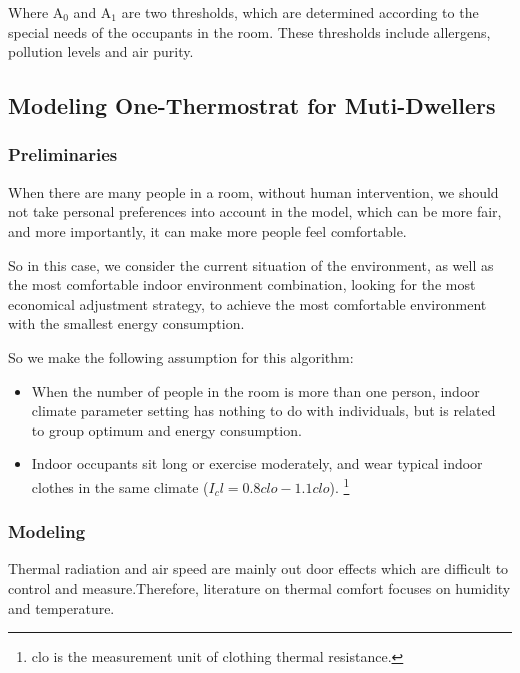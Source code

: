 \documentclass{mcmthesis}
\begin{document}
				Where $\mathrm{A_0}$ and $\mathrm{A_1}$ are two thresholds, which are determined according to the special needs of the occupants in the room. These thresholds include allergens, pollution levels and air purity.
				
		\subsection{Modeling One-Thermostrat for Muti-Dwellers}
			\subsubsection{Preliminaries}
			
			When there are many people in a room, without human intervention, we should not take personal preferences into account in the model, which can be more fair, and more importantly, it can make more people feel comfortable.
			
			So in this case, we consider the current situation of the environment, as well as the most comfortable indoor environment combination, looking for the most economical adjustment strategy, to achieve the most comfortable environment with the smallest energy consumption.
			
			So we make the following assumption for this algorithm:
			
			\begin{itemize}
				\item When the number of people in the room is more than one person, indoor climate parameter setting has nothing to do with individuals, but is related to group optimum and energy consumption.
				
				\item Indoor occupants sit long or exercise moderately, and wear typical indoor clothes in the same climate ($I_cl = 0.8clo-1.1clo$).
				\footnote{clo is the measurement unit of clothing thermal resistance.}
			\end{itemize}
		
		

		
		
			\subsubsection{Modeling}
			
			Thermal radiation and air speed are mainly out door effects which are difficult to control and measure.Therefore, literature on thermal comfort focuses on humidity and temperature.
			
\end{document}

